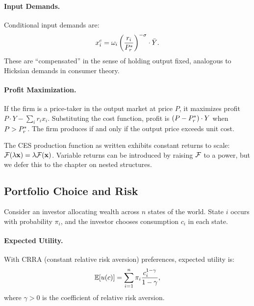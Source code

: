 \paragraph{Input Demands.}
Conditional input demands are:
\begin{equation}
x_i^c = \omega_i \left( \frac{r_i}{P^{*}_r} \right)^{-\sigma} \cdot \bar{Y}.
\end{equation}
These are ``compensated'' in the sense of holding output fixed, analogous to Hicksian demands in consumer theory.

\paragraph{Profit Maximization.}
If the firm is a price-taker in the output market at price $P$, it maximizes profit $P \cdot Y - \sum_i r_i x_i$. Substituting the cost function, profit is $(P - P^{*}_r) \cdot Y$ when $P > P^{*}_r$. The firm produces if and only if the output price exceeds unit cost.

\begin{calloutnote}
The CES production function as written exhibits constant returns to scale: $\mathcal{F}(\lambda \mathbf{x}) = \lambda \mathcal{F}(\mathbf{x})$. Variable returns can be introduced by raising $\mathcal{F}$ to a power, but we defer this to the chapter on nested structures.
\end{calloutnote}

\subsection{Portfolio Choice and Risk}
\label{subsec:portfolio}

Consider an investor allocating wealth across $n$ states of the world. State $i$ occurs with probability $\pi_i$, and the investor chooses consumption $c_i$ in each state.

\paragraph{Expected Utility.}
With CRRA (constant relative risk aversion) preferences, expected utility is:
\begin{equation}
\mathbb{E}[u(c)] = \sum_{i=1}^{n} \pi_i \frac{c_i^{1-\gamma}}{1-\gamma},
\end{equation}
where $\gamma > 0$ is the coefficient of relative risk aversion.

